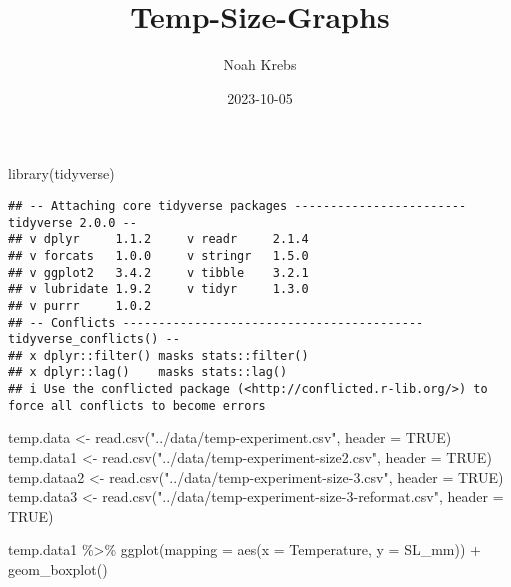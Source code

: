 \documentclass[
]{article}
\title{Temp-Size-Graphs}
\author{Noah Krebs}
\date{2023-10-05}
\newenvironment{Shaded}{\begin{snugshade}}{\end{snugshade}}
\newcommand{\AttributeTok}[1]{\textcolor[rgb]{0.77,0.63,0.00}{#1}}
\newcommand{\ConstantTok}[1]{\textcolor[rgb]{0.00,0.00,0.00}{#1}}
\newcommand{\FunctionTok}[1]{\textcolor[rgb]{0.00,0.00,0.00}{#1}}
\newcommand{\NormalTok}[1]{#1}
\newcommand{\OtherTok}[1]{\textcolor[rgb]{0.56,0.35,0.01}{#1}}
\newcommand{\SpecialCharTok}[1]{\textcolor[rgb]{0.00,0.00,0.00}{#1}}
\newcommand{\StringTok}[1]{\textcolor[rgb]{0.31,0.60,0.02}{#1}}
\begin{document}
\maketitle

\begin{Shaded}
\begin{Highlighting}[]
\FunctionTok{library}\NormalTok{(tidyverse)}
\end{Highlighting}
\end{Shaded}

\begin{verbatim}
## -- Attaching core tidyverse packages ------------------------ tidyverse 2.0.0 --
## v dplyr     1.1.2     v readr     2.1.4
## v forcats   1.0.0     v stringr   1.5.0
## v ggplot2   3.4.2     v tibble    3.2.1
## v lubridate 1.9.2     v tidyr     1.3.0
## v purrr     1.0.2     
## -- Conflicts ------------------------------------------ tidyverse_conflicts() --
## x dplyr::filter() masks stats::filter()
## x dplyr::lag()    masks stats::lag()
## i Use the conflicted package (<http://conflicted.r-lib.org/>) to force all conflicts to become errors
\end{verbatim}

\begin{Shaded}
\begin{Highlighting}[]
\NormalTok{temp.data }\OtherTok{\textless{}{-}} \FunctionTok{read.csv}\NormalTok{(}\StringTok{"../data/temp{-}experiment.csv"}\NormalTok{, }\AttributeTok{header =} \ConstantTok{TRUE}\NormalTok{)}
\NormalTok{temp.data1 }\OtherTok{\textless{}{-}} \FunctionTok{read.csv}\NormalTok{(}\StringTok{"../data/temp{-}experiment{-}size2.csv"}\NormalTok{, }\AttributeTok{header =} \ConstantTok{TRUE}\NormalTok{)}
\NormalTok{temp.dataa2 }\OtherTok{\textless{}{-}} \FunctionTok{read.csv}\NormalTok{(}\StringTok{"../data/temp{-}experiment{-}size{-}3.csv"}\NormalTok{, }\AttributeTok{header =} \ConstantTok{TRUE}\NormalTok{)}
\NormalTok{temp.data3 }\OtherTok{\textless{}{-}} \FunctionTok{read.csv}\NormalTok{(}\StringTok{"../data/temp{-}experiment{-}size{-}3{-}reformat.csv"}\NormalTok{, }\AttributeTok{header =} \ConstantTok{TRUE}\NormalTok{)}
\end{Highlighting}
\end{Shaded}

\begin{Shaded}
\begin{Highlighting}[]
\NormalTok{temp.data1 }\SpecialCharTok{\%\textgreater{}\%}
\FunctionTok{ggplot}\NormalTok{(}\AttributeTok{mapping =} \FunctionTok{aes}\NormalTok{(}\AttributeTok{x =}\NormalTok{ Temperature, }\AttributeTok{y =}\NormalTok{ SL\_mm)) }\SpecialCharTok{+} 
  \FunctionTok{geom\_boxplot}\NormalTok{()}
\end{Highlighting}
\end{Shaded}
\end{document}
